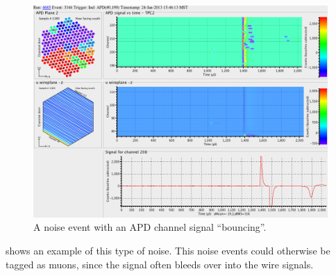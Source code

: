 \documentclass[herrin-thesis.tex]{subfiles}
\begin{document}
\begin{figure}[tbp]
\centering
\includegraphics[width=\columnwidth]{./plots/noise_eventdisplay_run_4685_ev_3344.png}
\caption{A noise event with an APD channel signal ``bouncing''.}
\label{fig:noise_apd_bounce}
\end{figure}

 shows an example of this type of noise. This noise events could otherwise be tagged as muons, since the signal often bleeds over into the wire signals.
\end{document}
